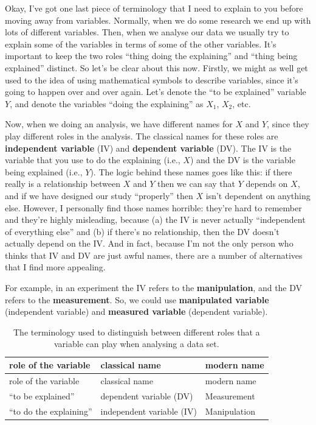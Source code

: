 \documentclass[
]{book}
\begin{document}
Okay, I've got one last piece of terminology that I need to explain to you before moving away from variables. Normally, when we do some research we end up with lots of different variables. Then, when we analyse our data we usually try to explain some of the variables in terms of some of the other variables. It's important to keep the two roles ``thing doing the explaining'' and ``thing being explained'' distinct. So let's be clear about this now. Firstly, we might as well get used to the idea of using mathematical symbols to describe variables, since it's going to happen over and over again. Let's denote the ``to be explained'' variable \(Y\), and denote the variables ``doing the explaining'' as \(X_1\), \(X_2\), etc.

Now, when we doing an analysis, we have different names for \(X\) and \(Y\), since they play different roles in the analysis. The classical names for these roles are \textbf{independent variable} (IV) and \textbf{dependent variable} (DV). The IV is the variable that you use to do the explaining (i.e., \(X\)) and the DV is the variable being explained (i.e., \(Y\)). The logic behind these names goes like this: if there really is a relationship between \(X\) and \(Y\) then we can say that \(Y\) depends on \(X\), and if we have designed our study ``properly'' then \(X\) isn't dependent on anything else. However, I personally find those names horrible: they're hard to remember and they're highly misleading, because (a) the IV is never actually ``independent of everything else'' and (b) if there's no relationship, then the DV doesn't actually depend on the IV. And in fact, because I'm not the only person who thinks that IV and DV are just awful names, there are a number of alternatives that I find more appealing.

For example, in an experiment the IV refers to the \textbf{manipulation}, and the DV refers to the \textbf{measurement}. So, we could use \textbf{manipulated variable} (independent variable) and \textbf{measured variable} (dependent variable).

\begin{longtable}[]{@{}lll@{}}
\caption{The terminology used to distinguish between different roles that a variable can play when analysing a data set.}\tabularnewline
\toprule
role of the variable & classical name & modern name\tabularnewline
\midrule
\endfirsthead
\toprule
role of the variable & classical name & modern name\tabularnewline
\midrule
\endhead
``to be explained'' & dependent variable (DV) & Measurement\tabularnewline
``to do the explaining'' & independent variable (IV) & Manipulation\tabularnewline
\bottomrule
\end{longtable}
\end{document}
